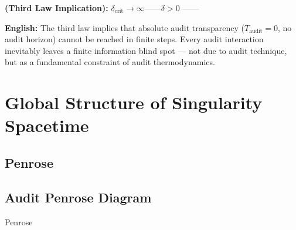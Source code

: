 \documentclass[12pt,a4paper]{article}
\theoremstyle{remark}
\begin{document}
\vspace{8pt}
\noindent
\textbf{ (Third Law Implication):}  $\delta_{\mathrm{crit}} \to \infty$——$\delta > 0$\textbf{} ——

\vspace{4pt}
\noindent
\textbf{English:} The third law implies that absolute audit transparency ($T_{\mathrm{audit}} = 0$, no audit horizon) cannot be reached in finite steps. Every audit interaction inevitably leaves a finite information blind spot — not due to audit technique, but as a fundamental constraint of audit thermodynamics.

\section{}
\section{Global Structure of Singularity Spacetime}

\subsection{Penrose}
\subsection{Audit Penrose Diagram}

\noindent
\textbf{} Penrose
\end{document}

